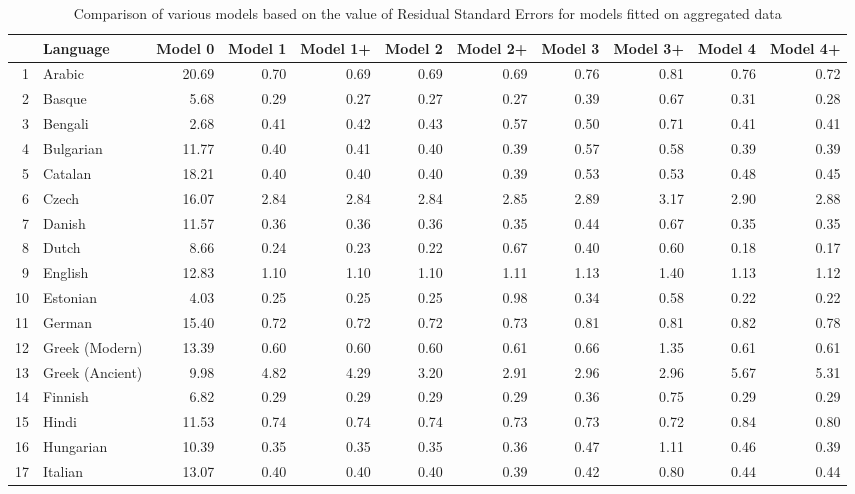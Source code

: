 \documentclass[a4paper]{article}
\begin{document}
\pagestyle{empty}
\begin{table}
	\caption{Comparison of various models based on the value of Residual Standard Errors for models fitted on aggregated data} \label{table:NSFAccuDivBG}%
	\centering
	\begin{tabular}{rlrrrrrrrrr}
		\hline
		& Language & Model 0 & Model 1 & Model 1+ & Model 2 & Model 2+ & Model 3 & Model 3+ & Model 4 & Model 4+ \\ 
		\hline
		1 & Arabic & 20.69 & 0.70 & 0.69 & 0.69 & 0.69 & 0.76 & 0.81 & 0.76 & 0.72 \\ 
		2 & Basque & 5.68 & 0.29 & 0.27 & 0.27 & 0.27 & 0.39 & 0.67 & 0.31 & 0.28 \\ 
		3 & Bengali & 2.68 & 0.41 & 0.42 & 0.43 & 0.57 & 0.50 & 0.71 & 0.41 & 0.41 \\ 
		4 & Bulgarian & 11.77 & 0.40 & 0.41 & 0.40 & 0.39 & 0.57 & 0.58 & 0.39 & 0.39 \\ 
		5 & Catalan & 18.21 & 0.40 & 0.40 & 0.40 & 0.39 & 0.53 & 0.53 & 0.48 & 0.45 \\ 
		6 & Czech & 16.07 & 2.84 & 2.84 & 2.84 & 2.85 & 2.89 & 3.17 & 2.90 & 2.88 \\ 
		7 & Danish & 11.57 & 0.36 & 0.36 & 0.36 & 0.35 & 0.44 & 0.67 & 0.35 & 0.35 \\ 
		8 & Dutch & 8.66 & 0.24 & 0.23 & 0.22 & 0.67 & 0.40 & 0.60 & 0.18 & 0.17 \\ 
		9 & English & 12.83 & 1.10 & 1.10 & 1.10 & 1.11 & 1.13 & 1.40 & 1.13 & 1.12 \\ 
		10 & Estonian & 4.03 & 0.25 & 0.25 & 0.25 & 0.98 & 0.34 & 0.58 & 0.22 & 0.22 \\ 
		11 & German & 15.40 & 0.72 & 0.72 & 0.72 & 0.73 & 0.81 & 0.81 & 0.82 & 0.78 \\ 
		12 & Greek (Modern) & 13.39 & 0.60 & 0.60 & 0.60 & 0.61 & 0.66 & 1.35 & 0.61 & 0.61 \\ 
		13 & Greek (Ancient) & 9.98 & 4.82 & 4.29 & 3.20 & 2.91 & 2.96 & 2.96 & 5.67 & 5.31 \\ 
		14 & Finnish & 6.82 & 0.29 & 0.29 & 0.29 & 0.29 & 0.36 & 0.75 & 0.29 & 0.29 \\ 
		15 & Hindi & 11.53 & 0.74 & 0.74 & 0.74 & 0.73 & 0.73 & 0.72 & 0.84 & 0.80 \\ 
		16 & Hungarian & 10.39 & 0.35 & 0.35 & 0.35 & 0.36 & 0.47 & 1.11 & 0.46 & 0.39 \\ 
		17 & Italian & 13.07 & 0.40 & 0.40 & 0.40 & 0.39 & 0.42 & 0.80 & 0.44 & 0.44 \\ 

\end{tabular}
\end{table}
\end{document}
